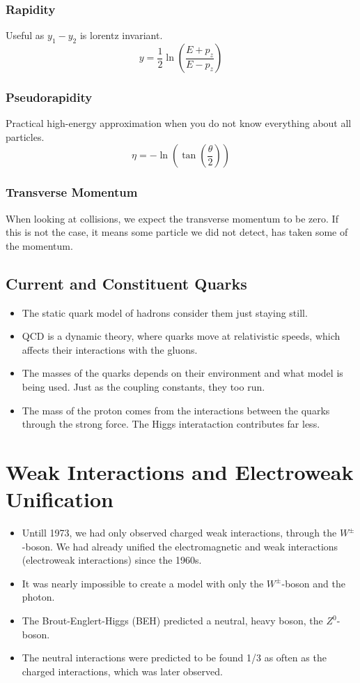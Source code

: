 \subsubsection{Rapidity}
Useful as $y_1 - y_2$ is lorentz invariant. 
\begin{equation}
  y = \frac{1}{2} \ln \left(\frac{E + p_z}{E - p_z}\right)
\end{equation}
\subsubsection{Pseudorapidity}
Practical high-energy approximation when you do not know everything about all particles. 
\begin{equation}
  η = -\ln \left(\tan \left(\frac{θ}{2}\right)\right)
\end{equation}

\subsubsection{Transverse Momentum}
When looking at collisions, we expect the transverse momentum to be zero. If this is not the case, it means some particle we did not detect, has taken some of the momentum.

\subsection{Current and Constituent Quarks}
\begin{itemize}
  \item The static quark model of hadrons consider them just staying still. 
  \item QCD is a dynamic theory, where quarks move at relativistic speeds, which affects their interactions with the gluons. 
  \item The masses of the quarks depends on their environment and what model is being used. Just as the coupling constants, they too run. 
  \item The mass of the proton comes from the interactions between the quarks through the strong force. The Higgs interataction contributes far less. 
\end{itemize}


\section{Weak Interactions and Electroweak Unification}
\begin{itemize}
  \item Untill 1973, we had only observed charged weak interactions, through the $W^{\pm}$-boson. We had already unified the electromagnetic and weak interactions (electroweak interactions) since the 1960s.
  \item It was nearly impossible to create a model with only the $W^{\pm}$-boson and the photon.
  \item The Brout-Englert-Higgs (BEH) predicted a neutral, heavy boson, the $Z^0$-boson.
  \item The neutral interactions were predicted to be found 1/3 as often as the charged interactions, which was later observed. 
\end{itemize}

